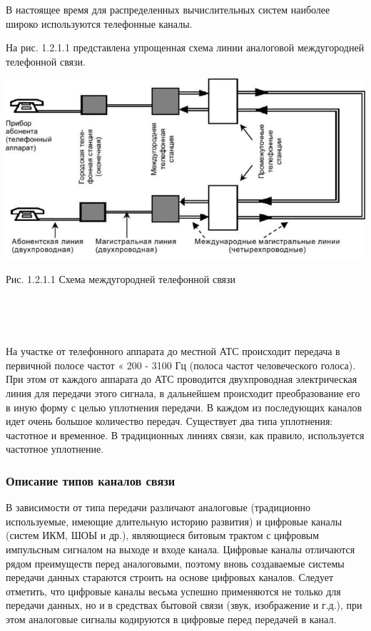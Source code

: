 \documentclass[a4paper]{report}
\begin{document}
В настоящее время для распределенных вычислительных систем наиболее широко используются телефонные каналы.

На рис. 1.2.1.1 представлена упрощенная схема линии аналоговой междугородней телефонной связи.

\includegraphics[scale=1.4]{66}
{\centering\caption{Рис. 1.2.1.1 Схема междугородней телефонной связи}\\}
~

На участке от телефонного аппарата до местной АТС происходит передача в первичной полосе частот « 200 - 3100 Гц (полоса частот человеческого голоса). При этом от каждого аппарата до АТС проводится двухпроводная электрическая линия для передачи этого сигнала, в дальнейшем происходит преобразование его в иную форму с целью уплотнения передачи. В каждом из последующих каналов идет очень большое количество передач. Существует два типа уплотнения: частотное и временное. В традиционных линиях связи, как правило, используется частотное уплотнение.

\subsubsection{Описание типов каналов связи}

В зависимости от типа передачи различают аналоговые (традиционно используемые, имеющие длительную историю развития) и цифровые каналы (систем ИКМ, ШОЫ и др.), являющиеся битовым трактом с цифровым импульсным сигналом на выходе и входе канала. Цифровые каналы отличаются рядом преимуществ перед аналоговыми, поэтому вновь создаваемые системы передачи данных стараются строить на основе цифровых каналов. Следует отметить, что цифровые каналы весьма успешно применяются не только для передачи данных, но и в средствах бытовой связи (звук, изображение и г.д.), при этом аналоговые сигналы кодируются в цифровые перед передачей в канал.
\end{document}
